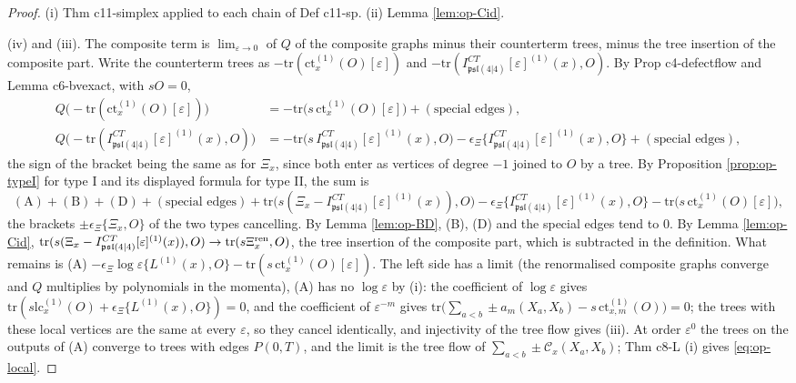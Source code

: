 \documentclass[11pt]{article}
\numberwithin{equation}{section}
\theoremstyle{plain}
\theoremstyle{definition}
\newcommand{\psl}{\mathfrak{psl}(4|4)}
\newcommand{\lc}{\mathrm{lc}}
\newcommand{\ct}{\mathrm{ct}}
\newcommand{\Comp}{\mathcal C}
\begin{document}
\begin{proof}
(i) Thm c11-simplex applied to each chain of Def c11-sp. (ii) Lemma \ref{lem:op-Cid}.

(iv) and (iii). The composite term is $\lim_{\varepsilon\to0}$ of $Q$ of the composite graphs minus their counterterm trees, minus the tree insertion of the composite part. Write the counterterm trees as $-\mathrm{tr}(\ct^{(1)}_x(O)[\varepsilon])$ and $-\mathrm{tr}(I^{CT}_{\psl}[\varepsilon]^{(1)}(x),O)$. By Prop c4-defectflow and Lemma c6-bvexact, with $sO=0$,
\[
\begin{aligned}
Q\big(-\mathrm{tr}(\ct^{(1)}_x(O)[\varepsilon])\big)&=-\mathrm{tr}\big(s\,\ct^{(1)}_x(O)[\varepsilon]\big)+(\text{special edges}),\\
Q\big(-\mathrm{tr}(I^{CT}_{\psl}[\varepsilon]^{(1)}(x),O)\big)&=-\mathrm{tr}\big(s\,I^{CT}_{\psl}[\varepsilon]^{(1)}(x),O\big)-\epsilon_\Xi\{I^{CT}_{\psl}[\varepsilon]^{(1)}(x),O\}+(\text{special edges}),
\end{aligned}
\]
the sign of the bracket being the same as for $\Xi_x$, since both enter as vertices of degree $-1$ joined to $O$ by a tree. By Proposition \ref{prop:op-typeI} for type I and its displayed formula for type II, the sum is
\[
(\mathrm A)+(\mathrm B)+(\mathrm D)+(\text{special edges})+\mathrm{tr}\big(s(\Xi_x-I^{CT}_{\psl}[\varepsilon]^{(1)}(x)),O\big)-\epsilon_\Xi\{I^{CT}_{\psl}[\varepsilon]^{(1)}(x),O\}-\mathrm{tr}\big(s\,\ct^{(1)}_x(O)[\varepsilon]\big),
\]
the brackets $\pm\epsilon_\Xi\{\Xi_x,O\}$ of the two types cancelling. By Lemma \ref{lem:op-BD}, (B), (D) and the special edges tend to $0$. By Lemma \ref{lem:op-Cid}, $\mathrm{tr}(s(\Xi_x-I^{CT}_{\psl}[\varepsilon]^{(1)}(x)),O)\to\mathrm{tr}(s\Xi^{\rm ren}_x,O)$, the tree insertion of the composite part, which is subtracted in the definition. What remains is (A) $-\epsilon_\Xi\log\varepsilon\{L^{(1)}(x),O\}-\mathrm{tr}(s\,\ct^{(1)}_x(O)[\varepsilon])$. The left side has a limit (the renormalised composite graphs converge and $Q$ multiplies by polynomials in the momenta), (A) has no $\log\varepsilon$ by (i): the coefficient of $\log\varepsilon$ gives $\mathrm{tr}(s\lc^{(1)}_x(O)+\epsilon_\Xi\{L^{(1)}(x),O\})=0$, and the coefficient of $\varepsilon^{-m}$ gives $\mathrm{tr}\big(\sum_{a<b}\pm a_m(X_a,X_b)-s\,\ct^{(1)}_{x,m}(O)\big)=0$; the trees with these local vertices are the same at every $\varepsilon$, so they cancel identically, and injectivity of the tree flow gives (iii). At order $\varepsilon^0$ the trees on the outputs of (A) converge to trees with edges $P(0,T)$, and the limit is the tree flow of $\sum_{a<b}\pm\Comp_x(X_a,X_b)$; Thm c8-L (i) gives \eqref{eq:op-local}.


\end{proof}
\end{document}

